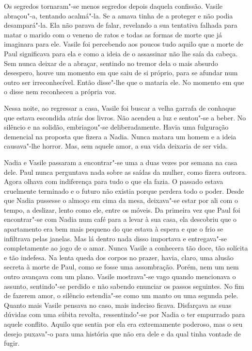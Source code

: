 Os segredos tornaram"-se menos segredos depois daquela confissão. Vasile
abraçou"-a, tentando acalmá"-la. Se a amava
tinha de a proteger e não podia desampará"-la. Ela não parava de falar,
revelando a sua tentativa falhada para matar o marido com o veneno de
ratos e todas as formas de morte que já imaginara para ele. Vasile foi
percebendo aos poucos tudo aquilo que a morte de Paul significava para
ela e como a ideia de o assassinar não lhe saía da cabeça. Sem nunca
deixar de a abraçar, sentindo no tremor dela o mais absurdo desespero,
houve um momento em que saiu de si próprio, para se afundar num outro
ser irreconhecível. Então disse"-lhe que o mataria ele. No momento em
que o disse nem reconheceu a própria voz.

Nessa noite, ao regressar a casa, Vasile foi buscar a velha garrafa de
conhaque que estava escondida atrás dos livros. Não acendeu a luz e
sentou"-se a beber. No silêncio e na solidão, embriagou"-se
deliberadamente. Havia uma fulguração demencial na proposta que fizera a
Nadia. Nunca matara um homem e a ideia causava"-lhe horror. Mas, sem
aquele amor, a sua vida deixaria de ser vida.

Nadia e Vasile passaram a encontrar"-se uma a duas vezes por semana na
casa dele. Paul nunca perguntava nada sobre as saídas da mulher, como
fizera outrora. Agora olhava com indiferença para tudo o que ela fazia.
O passado estava cruelmente terminado e o futuro não existia porque
perdera todo o poder. Desde que Nadia pussesse o almoço em cima da mesa,
deixava"-se estar por ali com o tempo, a deslizar, lento como ele, entre
os móveis. Da primeira vez que Paul foi encontrar"-se com Nadia num café
para a levar à sua casa, ela descobriu que o apartamento era bem mais
pequeno do que estava à espera
e que o frio se infiltrava pelas janelas. Mas lá dentro nada disso
importava e entregava"-se completamente ao jogo de o amar. Nunca Vasile a
conhecera tão doce, tão solícita e tão indefesa. Na lenta queda dos
corpos no prazer, havia, claro, uma alusão secreta à morte de Paul, como
se fosse uma assombração. Porém, nem um nem outro avançava com um plano.
Vasile mostrava"-se vago quando mencionava o assunto, sentindo"-se
perdido e não sabendo enunciar os passos seguintes. No fim de fazerem
amor, o silêncio estendia"-se como um manto ou uma segunda pele. Quanto
mais Vasile pensava no caso, mais indeciso ficava. Disfarçava as suas
dúvidas com uma súbita revolta, ressentindo"-se por Nadia o ter empurrado para aquele conflito. Aquilo que sentia
por ela era extremamente poderoso, mas o seu desejo puxava"-o para uma
história que não era dele e da qual tinha vontade de fugir.

